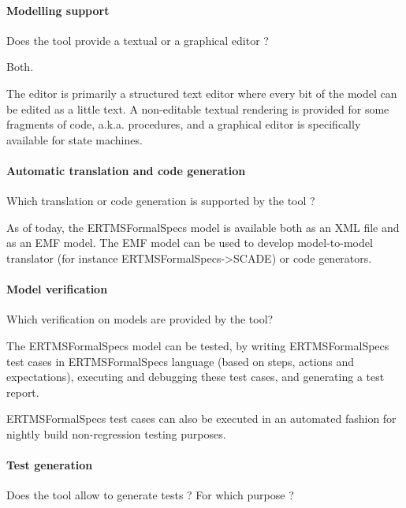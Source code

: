 \paragraph{Modelling support}
Does the tool provide a  textual or a graphical editor ?

\begin{author_comment}
Both.
\end{author_comment}

\begin{assessor1}
The editor is primarily a structured text editor where every bit of the model can be edited as a little text. 
A non-editable textual rendering is provided for some fragments of code, a.k.a. procedures, and a graphical editor is specifically available for state machines. 
\end{assessor1}

\paragraph{Automatic translation and code generation}
Which translation or code generation is supported by the tool ?

\begin{author_comment}
As of today, the ERTMSFormalSpecs model is available both as an XML file and as an EMF model. The EMF model can be used to develop model-to-model translator (for instance ERTMSFormalSpecs->SCADE) or code generators.
\end{author_comment}

\paragraph{Model verification}
Which verification on models are provided by the tool?

\begin{author_comment}
The ERTMSFormalSpecs model can be tested, by writing ERTMSFormalSpecs test cases in ERTMSFormalSpecs language (based on steps, actions and expectations), executing and debugging these test cases, and generating a test report. 

ERTMSFormalSpecs test cases can also be executed in an automated fashion for nightly build non-regression testing purposes.
\end{author_comment}

\paragraph{Test generation}
Does the tool allow to generate tests ? For  which purpose ?

